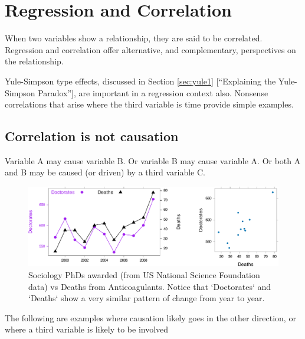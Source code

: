 \documentclass[
  10pt,
  b5paper]{book}
\begin{document}
\hypertarget{sec:reg}{%
\chapter{Regression and Correlation}\label{sec:reg}}

When two variables show a relationship, they are said to be
correlated. Regression and correlation offer alternative,
and complementary, perspectives on the relationship.

Yule-Simpson type effects, discussed in Section \ref{sec:yule1}
{[}``Explaining the Yule-Simpson Paradox''{]}, are important in a
regression context also. Nonsense correlations that arise
where the third variable is time provide simple examples.

\hypertarget{correlation-is-not-causation}{%
\section{Correlation is not causation}\label{correlation-is-not-causation}}

Variable A may cause variable B. Or variable B may cause
variable A. Or both A and B may be caused (or driven) by
a third variable C.

\begin{figure}

{\centering \includegraphics[width=1\linewidth]{07-regress_files/figure-latex/socAnti-1} 

}

\caption{Sociology PhDs awarded (from US National Science 
Foundation data) vs Deaths from Anticoagulants.  Notice
that `Doctorates` and `Deaths` show a very similar pattern
of change from year to year.
}\label{fig:socAnti}
\end{figure}

The following are examples where causation likely goes in the other
direction, or where a third variable is likely to be involved
\end{document}
